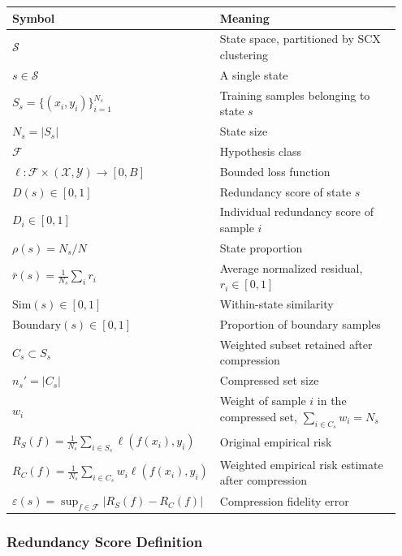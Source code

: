 \documentclass[
  12pt,
]{article}
\begin{document}
\begin{longtable}[]{@{}p{0.45\linewidth}p{0.50\linewidth}@{}}
\toprule\noalign{}
\begin{minipage}[b]{\linewidth}\raggedright
Symbol
\end{minipage} & \begin{minipage}[b]{\linewidth}\raggedright
Meaning
\end{minipage} \\
\midrule\noalign{}
\endhead
\bottomrule\noalign{}
\endlastfoot
\(\mathcal{S}\) & State space, partitioned by SCX clustering \\
\(s \in \mathcal{S}\) & A single state \\
\(S_s = \{(x_i, y_i)\}_{i=1}^{N_s}\) & Training samples belonging to state \(s\) \\
\(N_s = |S_s|\) & State size \\
\(\mathcal{F}\) & Hypothesis class \\
\(\ell: \mathcal{F} \times (\mathcal{X}, \mathcal{Y}) \to [0, B]\) & Bounded loss function \\
\(D(s) \in [0, 1]\) & Redundancy score of state \(s\) \\
\(D_i \in [0, 1]\) & Individual redundancy score of sample \(i\) \\
\(\rho(s) = N_s / N\) & State proportion \\
\(\bar{r}(s) = \frac{1}{N_s}\sum_i r_i\) & Average normalized residual, \(r_i \in [0, 1]\) \\
\(\text{Sim}(s) \in [0, 1]\) & Within-state similarity \\
\(\text{Boundary}(s) \in [0, 1]\) & Proportion of boundary samples \\
\(C_s \subset S_s\) & Weighted subset retained after compression \\
\(n_s' = |C_s|\) & Compressed set size \\
\(w_i\) & Weight of sample \(i\) in the compressed set, \(\sum_{i \in C_s} w_i = N_s\) \\
\(R_S(f) = \frac{1}{N_s} \sum_{i \in S_s} \ell(f(x_i), y_i)\) & Original empirical risk \\
\(R_C(f) = \frac{1}{N_s} \sum_{i \in C_s} w_i \ell(f(x_i), y_i)\) & Weighted empirical risk estimate after compression \\
\(\varepsilon(s) = \sup_{f \in \mathcal{F}} |R_S(f) - R_C(f)|\) & Compression fidelity error \\
\end{longtable}

\subsubsection{Redundancy Score Definition}\label{redundancy-score-definition}
\end{document}

